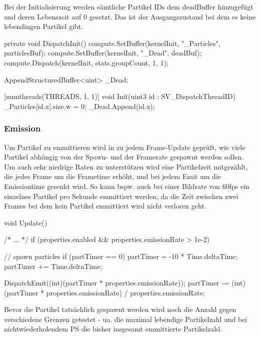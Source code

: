 Bei der Initialisierung werden sämtliche Partikel IDs dem deadBuffer hinzugefügt und deren Lebenszeit auf 0 gesetzt. Das ist der Ausgangszustand bei dem es keine lebendingen Partikel gibt.

\begin{csh}[caption=Controller Init Dispatch]
private void DispatchInit()
{
    compute.SetBuffer(kernelInit, "_Particles", particlesBuf);
    compute.SetBuffer(kernelInit, "_Dead", deadBuf);
    compute.Dispatch(kernelInit, stats.groupCount, 1, 1);
}
\end{csh}

\begin{hlsl}[caption=Compute Init Kernel]
AppendStructuredBuffer<uint> _Dead;

[numthreads(THREADS, 1, 1)]
void Init(uint3 id : SV_DispatchThreadID)
{
    _Particles[id.x].size.w = 0;
    _Dead.Append(id.x);
}
\end{hlsl}



\subsubsection{Emission}

Um Partikel zu emmittieren wird in zu jedem Frame-Update geprüft, wie viele Partikel abhängig von der Spawn- und der Framerate gespawnt werden sollen. Um auch sehr niedrige Raten zu unterstützen wird eine Partikelzeit mitgezählt, die jedes Frame um die Frametime erhöht, und bei jedem Emit um die Emissiontime gesenkt wird. So kann bspw. auch bei einer Bildrate von 60fps ein einzelnes Partikel pro Sekunde emmittiert werden, da die Zeit zwischen zwei Frames bei dem kein Partikel emmittiert wird nicht verloren geht.

\begin{csh}[caption=Controller Emission]
void Update()
{
    /* ... */
    if (properties.enabled && properties.emissionRate > 1e-2)
    {   // spawn particles
        if (partTimer == 0) partTimer = -10 * Time.deltaTime;
        partTimer += Time.deltaTime;

        DispatchEmit((int)(partTimer * properties.emissionRate));
        partTimer -= (int)(partTimer * properties.emissionRate) / properties.emissionRate;
    }
}
\end{csh}

Bevor die Partikel tatsächlich gespawnt werden wird noch die Anzahl gegen verschiedene Grenzen getestet - ua. die maximal lebendige Partikelzahl und bei nichtwiederholendem PS die bisher insgesamt emmittierte Partikelzahl.

